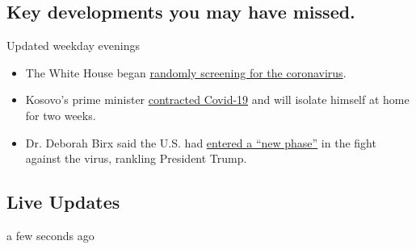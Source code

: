 \hypertarget{key-developments-you-may-have-missed}{%
\subsection{Key developments you may have
missed.}\label{key-developments-you-may-have-missed}}

Updated weekday evenings

\begin{itemize}
\tightlist
\item
  The White House began
  \href{https://www.nytimes3xbfgragh.onion/2020/08/03/world/coronavirus-covid-19.html\#link-c4a1d71}{randomly
  screening for the coronavirus}.
\item
  Kosovo's prime minister
  \href{https://nl.nytimes3xbfgragh.onion/f/a/umYjgHqFQS0DWGLnViksGQ~~/AAAAAQA~/RgRhCxH_P4QgAWh0dHBzOi8vd3d3LnJldXRlcnMuY29tL2FydGljbGUvdXMtaGVhbHRoLWNvcm9uYXZpcnVzLWtvc292by1wcmltZW1pbmlzdC9rb3Nvdm8tcHJpbWUtbWluaXN0ZXItc2F5cy1oZS1oYXMtY292aWQtMTktaWRVU0tCTjI0WTBPTj9jYW1wYWlnbl9pZD0xNTQmZW1jPWVkaXRfY2JfMjAyMDA4MDMmaW5zdGFuY2VfaWQ9MjA5NDQmbmw9Y29yb25hdmlydXMtYnJpZWZpbmcmcmVnaV9pZD0zNTQ2NDU0MSZzZWdtZW50X2lkPTM1MTI5JnRlPTEmdXNlcl9pZD02Njg0MjBkMWQ1MGVjZTM5ZTdlNGNkYmRkYzAxOTZkMFcDbnl0QgoAMv-MKF_UfRy_UhhrYXJlbi5iYXJyb3dAbnl0aW1lcy5jb21YBAAAAAA~}{contracted
  Covid-19} and will isolate himself at home for two weeks.
\item
  Dr. Deborah Birx said the U.S. had
  \href{https://www.nytimes3xbfgragh.onion/2020/08/03/world/coronavirus-covid-19.html}{entered
  a ``new phase''} in the fight against the virus, rankling President
  Trump.
\end{itemize}

\hypertarget{live-updates}{%
\subsection{Live Updates}\label{live-updates}}

a few seconds ago

